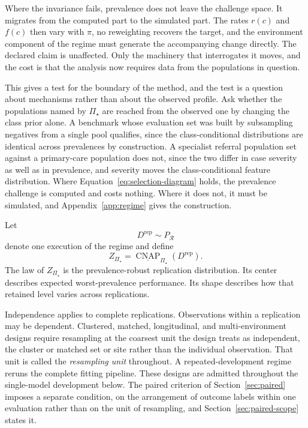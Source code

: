 \documentclass[11pt]{article}
\newcommand{\CNAP}{\operatorname{CNAP}}
\newcommand{\Regime}{\mathcal{R}}
\newcommand{\PSet}{\Pi_\star}
\newcommand{\RobCNAP}{\underline{\CNAP}_{\PSet}}
\theoremstyle{remark}
\begin{document}
Where the invariance fails, prevalence does not leave the challenge space. It migrates from the computed part to the simulated part. The rates $r(c)$ and $f(c)$ then vary with $\pi$, no reweighting recovers the target, and the environment component of the regime must generate the accompanying change directly. The declared claim is unaffected. Only the machinery that interrogates it moves, and the cost is that the analysis now requires data from the populations in question.

This gives a test for the boundary of the method, and the test is a question about mechanisms rather than about the observed profile. Ask whether the populations named by $\PSet$ are reached from the observed one by changing the class prior alone. A benchmark whose evaluation set was built by subsampling negatives from a single pool qualifies, since the class-conditional distributions are identical across prevalences by construction. A specialist referral population set against a primary-care population does not, since the two differ in case severity as well as in prevalence, and severity moves the class-conditional feature distribution. Where Equation~\eqref{eq:selection-diagram} holds, the prevalence challenge is computed and costs nothing. Where it does not, it must be simulated, and Appendix~\ref{app:regime} gives the construction.

Let
\[
D^{\mathrm{rep}}\sim P_{\Regime}
\]
denote one execution of the regime and define
\begin{equation}
Z_{\PSet}
=
\RobCNAP(D^{\mathrm{rep}}).
\label{eq:robust-replication-effect}
\end{equation}
The law of $Z_{\PSet}$ is the prevalence-robust replication distribution. Its center describes expected worst-prevalence performance. Its shape describes how that retained level varies across replications.

Independence applies to complete replications. Observations within a replication may be dependent. Clustered, matched, longitudinal, and multi-environment designs require resampling at the coarsest unit the design treats as independent, the cluster or matched set or site rather than the individual observation. That unit is called the \emph{resampling unit} throughout. A repeated-development regime reruns the complete fitting pipeline. These designs are admitted throughout the single-model development below. The paired criterion of Section~\ref{sec:paired} imposes a separate condition, on the arrangement of outcome labels within one evaluation rather than on the unit of resampling, and Section~\ref{sec:paired-scope} states it.
\end{document}
